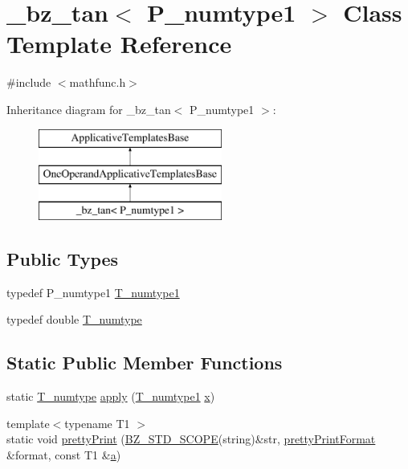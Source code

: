 \hypertarget{class__bz__tan}{}\section{\+\_\+bz\+\_\+tan$<$ P\+\_\+numtype1 $>$ Class Template Reference}
\label{class__bz__tan}


{\ttfamily \#include $<$mathfunc.\+h$>$}

Inheritance diagram for \+\_\+bz\+\_\+tan$<$ P\+\_\+numtype1 $>$\+:\begin{figure}[H]
\begin{center}
\leavevmode
\includegraphics[height=3.000000cm]{class__bz__tan}
\end{center}
\end{figure}
\subsection*{Public Types}
\begin{DoxyCompactItemize}
\item 
typedef P\+\_\+numtype1 \hyperlink{class__bz__tan_a9943923b0160d60339d337e66adff293}{T\+\_\+numtype1}
\item 
typedef double \hyperlink{class__bz__tan_a705971800ff3ebeba34c0d138690d057}{T\+\_\+numtype}
\end{DoxyCompactItemize}
\subsection*{Static Public Member Functions}
\begin{DoxyCompactItemize}
\item 
static \hyperlink{class__bz__tan_a705971800ff3ebeba34c0d138690d057}{T\+\_\+numtype} \hyperlink{class__bz__tan_ac61caa5e55d628f08fe46ad5af4583c0}{apply} (\hyperlink{class__bz__tan_a9943923b0160d60339d337e66adff293}{T\+\_\+numtype1} \hyperlink{vecnorm1_8cc_ac73eed9e41ec09d58f112f06c2d6cb63}{x})
\item 
{\footnotesize template$<$typename T1 $>$ }\\static void \hyperlink{class__bz__tan_ae8a2394936b6e3f05d229a407bb41413}{pretty\+Print} (\hyperlink{numinquire_8h_a2b24ffc3b4ef9803956bc7715c6c7b83}{B\+Z\+\_\+\+S\+T\+D\+\_\+\+S\+C\+O\+P\+E}(string)\&str, \hyperlink{classprettyPrintFormat}{pretty\+Print\+Format} \&format, const T1 \&\hyperlink{gen__mat5files_8m_aae328bf20413f220e38aec4d95bfd6da}{a})
\end{DoxyCompactItemize}


